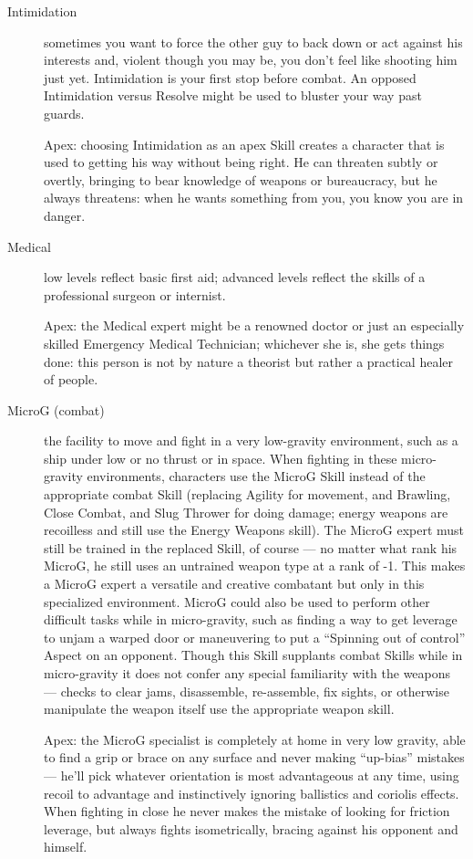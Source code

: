 \begin{description}
\item[Intimidation]
sometimes you want to force the other guy to back down or act against his interests and, violent though you may be, you don't feel like shooting him just yet. Intimidation is your first stop before combat. An opposed Intimidation versus Resolve might be used to bluster your way past guards.

Apex: choosing Intimidation as an apex Skill creates a character that is used to getting his way without being right. He can threaten subtly or overtly, bringing to bear knowledge of weapons or bureaucracy, but he always threatens: when he wants something from you, you know you are in danger.

\item[Medical]
low levels reflect basic first aid; advanced levels reflect the skills of a professional surgeon or internist.

Apex: the Medical expert might be a renowned doctor or just an especially skilled Emergency Medical Technician; whichever she is, she gets things done: this person is not by nature a theorist but rather a practical healer of people.

\item[MicroG (combat)]
the facility to move and fight in a very low-gravity environment, such as a ship under low or no thrust or in space. When fighting in these micro-gravity environments, characters use the MicroG Skill instead of the appropriate combat Skill (replacing Agility for movement, and Brawling, Close Combat, and Slug Thrower for doing damage; energy weapons are recoilless and still use the Energy Weapons skill). The MicroG expert must still be trained in the replaced Skill, of course --- no matter what rank his MicroG, he still uses an untrained weapon type at a rank of -1. This makes a MicroG expert a versatile and creative combatant but only in this specialized environment. MicroG could also be used to perform other difficult tasks while in micro-gravity, such as finding a way to get leverage to unjam a warped door or maneuvering to put a ``Spinning out of control'' Aspect on an opponent. Though this Skill supplants combat Skills while in micro-gravity it does not confer any special familiarity with the weapons --- checks to clear jams, disassemble, re-assemble, fix sights, or otherwise manipulate the weapon itself use the appropriate weapon skill.

Apex: the MicroG specialist is completely at home in very low gravity, able to find a grip or brace on any surface and never making ``up-bias'' mistakes --- he'll pick whatever orientation is most advantageous at any time, using recoil to advantage and instinctively ignoring ballistics and coriolis effects. When fighting in close he never makes the mistake of looking for friction leverage, but always fights isometrically, bracing against his opponent and himself.


\end{description}
